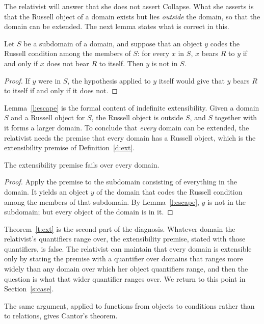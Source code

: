 \documentclass{situationist-preprint}
\begin{document}
The relativist will answer that she does not assert Collapse. What she asserts is that the Russell object of a domain exists but lies \emph{outside} the domain, so that the domain can be extended. The next lemma states what is correct in this.

\begin{lemma}[Escape]\label{l:escape}
Let $S$ be a subdomain of a domain, and suppose that an object $y$ codes the Russell condition among the members of $S$: for every $x$ in $S$, $x$ bears $R$ to $y$ if and only if $x$ does not bear $R$ to itself. Then $y$ is not in $S$.
\end{lemma}

\begin{proof}
If $y$ were in $S$, the hypothesis applied to $y$ itself would give that $y$ bears $R$ to itself if and only if it does not.
\end{proof}

Lemma~\ref{l:escape} is the formal content of indefinite extensibility. Given a domain $S$ and a Russell object for $S$, the Russell object is outside $S$, and $S$ together with it forms a larger domain. To conclude that \emph{every} domain can be extended, the relativist needs the premise that every domain has a Russell object, which is the extensibility premise of Definition~\ref{d:ext}.

\begin{theorem}\label{t:ext}
The extensibility premise fails over every domain.
\end{theorem}

\begin{proof}
Apply the premise to the subdomain consisting of everything in the domain. It yields an object $y$ of the domain that codes the Russell condition among the members of that subdomain. By Lemma~\ref{l:escape}, $y$ is not in the subdomain; but every object of the domain is in it.
\end{proof}

Theorem~\ref{t:ext} is the second part of the diagnosis. Whatever domain the relativist's quantifiers range over, the extensibility premise, stated with those quantifiers, is false. The relativist can maintain that every domain is extensible only by stating the premise with a quantifier over domains that ranges more widely than any domain over which her object quantifiers range, and then the question is what that wider quantifier ranges over. We return to this point in Section~\ref{s:case}.

The same argument, applied to functions from objects to conditions rather than to relations, gives Cantor's theorem.
\end{document}
